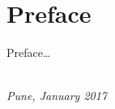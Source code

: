 \chapter*{Preface}

Preface\ldots

\begin{flushright}
{\makeatletter\itshape
    \@firstname\ \@lastname \\
    Pune, January 2017
\makeatother}
\end{flushright}

